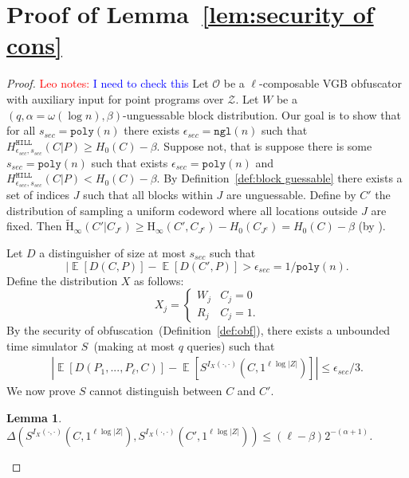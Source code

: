 \documentclass[11pt]{article}
\newcommand{\defref}[1]{\mbox{Definition~\ref{#1}}}
\newcommand{\lemref}[1]{\mbox{Lemma~\ref{#1}}}
\DeclareMathOperator*{\expe}{\mathbb{E}}
\newcommand{\hill}{\ensuremath{\mathtt{HILL}}\xspace}
\newcommand{\poly}{\ensuremath{\mathtt{poly}}\xspace}
\newcommand{\ngl}{\ensuremath{\mathtt{ngl}}\xspace}
\newcommand{\Hoo}{\mathrm{H}_\infty}
\newcommand{\Hav}{\tilde{\mathrm{H}}_\infty}
\newtheorem{lemma}[theorem]{Lemma}
\newcommand{\authnote}[2]{{\textcolor{red}{\textsf{#1 notes: }\textcolor{blue}{ #2}}\marginpar{\textcolor{red}{\textbf{!!!!!}}}}}
\newcommand{\authnote}[2]{}
\newcommand{\lnote}[1]{{\authnote{Leo}{#1}}}
\begin{document}
\section{Proof of \lemref{lem:security of cons}}
\label{app:security of main cons}
\begin{proof}
\lnote{I need to check this}
Let $\mathcal{O}$ be a $\ell$-composable VGB obfuscator with auxiliary input for point programs over $\mathcal{Z}$.  Let $W$ be a $(q, \alpha = \omega(\log n), \beta)$-unguessable block distribution.  Our goal is to show that for all $s_{sec} = \poly(n)$ there exists $\epsilon_{sec} =\ngl(n)$ such that $H^{\hill}_{\epsilon_{sec}, s_{sec}}(C|P)\geq H_0(C)- \beta$. %
Suppose not, that is suppose there is some $s_{sec} = \poly(n)$ such that exists $\epsilon_{sec} = \poly(n)$ and $H^{\hill}_{\epsilon_{sec}, s_{sec}}(C|P) < H_0(C)-\beta$.
By \defref{def:block guessable} there exists a set of indices $J$ such that all blocks within $J$ are unguessable.  Define by $C'$ the distribution of sampling a uniform codeword where all locations outside $J$ are fixed.  Then 
$\Hav(C' | C_{J^c}) \ge \Hoo(C', C_{J^c}) - H_0(C_{J^c})  = H_0(C) - \beta$ (by \cite[Lemma 2.2b]{DBLP:journals/siamcomp/DodisORS08}). 

Let $D$ a distinguisher of size at most $s_{sec}$ such that
\[
| \expe[D(C, P)] - \expe[D(C', P)] > \epsilon_{sec} = 1/\poly(n).
\]
Define the distribution $X$ as follows:
\[X_j =
\begin{cases}
W_j & C_j = 0\\
R_j & C_j = 1.
\end{cases}\]  By the security of obfuscation~(\defref{def:obf}), there exists a unbounded time simulator $S$~(making at most $q$ queries) such that
\begin{align}
\label{eq:dist before}
|\expe [D(P_1,..., P_\ell, C)] - \expe [S^{I_X(\cdot, \cdot)}(C, 1^{\ell \log |Z|})] |\leq \epsilon_{sec}/3.
\end{align}
We now prove $S$ cannot distinguish between $C$ and $C'$.
\begin{lemma}
\label{lem:sim cannot distinguish}
$\Delta(S^{I_X(\cdot, \cdot)}(C, 1^{\ell \log |Z|}), S^{I_X(\cdot, \cdot)}(C', 1^{\ell \log |Z|})) \le (\ell-\beta) 2^{-(\alpha+1)}$.
\end{lemma}


\end{proof}
\end{document}
